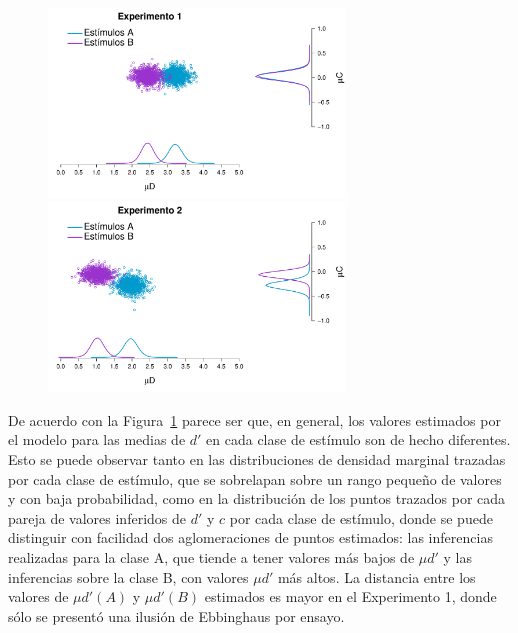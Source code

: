 \begin{figure}[th]
\centering
\includegraphics[width=0.7\textwidth]{Figures/MDelta_Joint_E1}\\
\includegraphics[width=0.7\textwidth]{Figures/MDelta_Joint_E2}\\
\caption[Modelo Delta: Distribuciones posteriores marginales y conjuntas para las medias de $d'$ y $c$ en cada clase de estímulo]{}
\label{fig:Delta_Joints}
\end{figure}

De acuerdo con la Figura~\ref{fig:Delta_Joints} parece ser que, en general, los valores estimados por el modelo para las medias de $d'$ en cada clase de estímulo son de hecho diferentes. Esto se puede observar tanto en las distribuciones de densidad marginal trazadas por cada clase de estímulo, que se sobrelapan sobre un rango pequeño de valores y con baja probabilidad, como en la distribución de los puntos trazados por cada pareja de valores inferidos de $d'$ y $c$ por cada clase de estímulo, donde se puede distinguir con facilidad dos aglomeraciones de puntos estimados: las inferencias realizadas para la clase A, que tiende a tener valores más bajos de $\mu d'$ y las inferencias sobre la clase B, con valores $\mu d'$ más altos. La distancia entre los valores de $\mu d'(A)$ y $\mu d'(B)$ estimados es mayor en el Experimento 1, donde sólo se presentó una ilusión de Ebbinghaus por ensayo.\\


